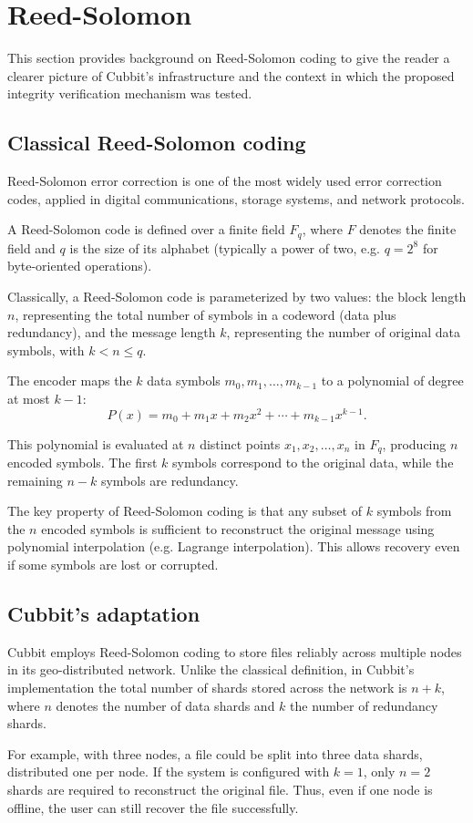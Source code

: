 \section{Reed-Solomon} \label{sec:reed-solomon}

This section provides background on Reed-Solomon coding to give the reader a clearer picture of Cubbit's infrastructure and the context in which the proposed integrity verification mechanism was tested.

\subsection{Classical Reed-Solomon coding}

Reed-Solomon error correction \cite{reed1960polynomial} is one of the most widely used error correction codes, applied in digital communications, storage systems, and network protocols.

A Reed-Solomon code is defined over a finite field $F_q$, where $F$ denotes the finite field and $q$ is the size of its alphabet (typically a power of two, e.g. $q=2^8$ for byte-oriented operations).  

Classically, a Reed-Solomon code is parameterized by two values: the block length $n$, representing the total number of symbols in a codeword (data plus redundancy), and the message length $k$, representing the number of original data symbols, with $k < n \leq q$.

The encoder maps the $k$ data symbols $m_0, m_1, \ldots, m_{k-1}$ to a polynomial of degree at most $k-1$:
\begin{equation}
P(x) = m_0 + m_1x + m_2x^2 + \cdots + m_{k-1}x^{k-1}.
\end{equation}

This polynomial is evaluated at $n$ distinct points $x_1, x_2, \ldots, x_n$ in $F_q$, producing $n$ encoded symbols. The first $k$ symbols correspond to the original data, while the remaining $n-k$ symbols are redundancy.  

The key property of Reed-Solomon coding is that any subset of $k$ symbols from the $n$ encoded symbols is sufficient to reconstruct the original message using polynomial interpolation (e.g. Lagrange interpolation). This allows recovery even if some symbols are lost or corrupted.

\subsection{Cubbit's adaptation} \label{sec:reed-solomon-in-cubbit}

Cubbit employs Reed-Solomon coding to store files reliably across multiple nodes in its geo-distributed network. Unlike the classical definition, in Cubbit's implementation the total number of shards stored across the network is $n+k$, where $n$ denotes the number of data shards and $k$ the number of redundancy shards.

For example, with three nodes, a file could be split into three data shards,
distributed one per node. If the system is configured with $k=1$, only $n=2$
shards are required to reconstruct the original file. Thus, even if one node is offline, the user can still recover the file successfully.  
